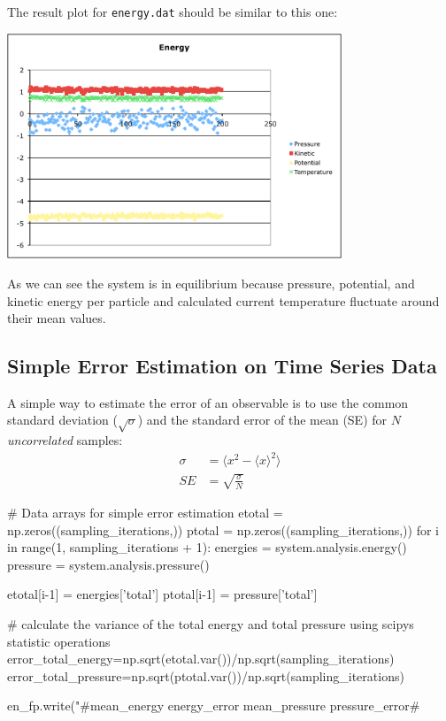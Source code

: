 \documentclass[
paper=a4,                       %
fontsize=11pt,                  %
twoside,                        %
footsepline,                    %
headsepline,                    %
headinclude=false,              %
footinclude=false,              %
pagesize,                       %
]{scrartcl}
\begin{document}
The result plot for \texttt{energy.dat}
should be similar to this one:
\begin{center}
  \includegraphics[width=10cm]{figures/energy}
\end{center}
\noindent As we can see the system is in equilibrium because pressure, potential, and kinetic energy per particle 
and calculated current temperature fluctuate around their mean values.

   
\subsection{Simple Error Estimation on Time Series Data}
A simple way to estimate the error of an observable is to use the common standard
deviation ($\sqrt{\sigma}$) and the standard error of the mean (SE) for $N$
\emph{uncorrelated} samples:
\begin{align}
    \sigma  &= \langle x^2 - \langle x\rangle^2 \rangle \\
    SE      &= \sqrt{\frac{\sigma}{N}}
    \label{eq:variance}
\end{align}

\begin{pypresso}
# Data arrays for simple error estimation
etotal = np.zeros((sampling_iterations,))
ptotal = np.zeros((sampling_iterations,))
for i in range(1, sampling_iterations + 1):
    energies = system.analysis.energy()
    pressure = system.analysis.pressure()

    etotal[i-1] = energies['total']
    ptotal[i-1] = pressure['total']

# calculate the variance of the total energy and total pressure using scipys statistic operations
error_total_energy=np.sqrt(etotal.var())/np.sqrt(sampling_iterations)
error_total_pressure=np.sqrt(ptotal.var())/np.sqrt(sampling_iterations)

en_fp.write("#mean_energy energy_error mean_pressure pressure_error\n#%
\end{pypresso}
\end{document}
